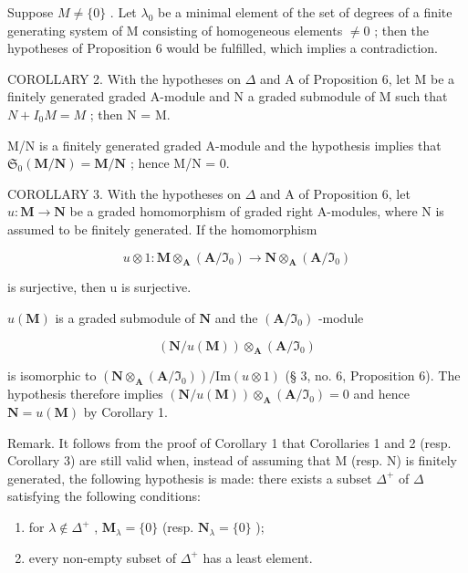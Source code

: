 Suppose \(M \neq \{0\}\) . Let \(\lambda_{0}\) be a minimal element of the set of degrees of a finite generating system of M consisting of homogeneous elements \(\neq0\) ; then the hypotheses of Proposition 6 would be fulfilled, which implies a contradiction.

COROLLARY 2. With the hypotheses on \(\Delta\) and A of Proposition 6, let M be a finitely generated graded A-module and N a graded submodule of M such that \(N + I_{0}M = M\) ; then N = M.

M/N is a finitely generated graded A-module and the hypothesis implies that \(\mathfrak{S}_{0}(\mathbf{M}/\mathbf{N}) = \mathbf{M}/\mathbf{N}\) ; hence M/N = 0.

COROLLARY 3. With the hypotheses on \(\Delta\) and A of Proposition 6, let \(u: \mathbf{M} \to \mathbf{N}\) be a graded homomorphism of graded right A-modules, where N is assumed to be finitely generated. If the homomorphism

\[
u \otimes 1: \mathbf {M} \otimes_ {\mathbf {A}} (\mathbf {A} / \mathfrak {I} _ {0}) \rightarrow \mathbf {N} \otimes_ {\mathbf {A}} (\mathbf {A} / \mathfrak {I} _ {0})
\]

is surjective, then u is surjective.

\(u(\mathbf{M})\) is a graded submodule of \(\mathbf{N}\) and the \((\mathbf{A} / \mathfrak{I}_0)\) -module

\[
(\mathbf {N} / u (\mathbf {M})) \otimes_ {\mathbf {A}} (\mathbf {A} / \mathfrak {I} _ {0})
\]

is isomorphic to \((\mathbf{N} \otimes_{\mathbf{A}} (\mathbf{A} / \mathfrak{I}_0)) / \mathrm{Im}(u \otimes 1)\) (§ 3, no. 6, Proposition 6). The hypothesis therefore implies \((\mathbf{N} / u(\mathbf{M})) \otimes_{\mathbf{A}} (\mathbf{A} / \mathfrak{I}_0) = 0\) and hence \(\mathbf{N} = u(\mathbf{M})\) by Corollary 1.

Remark. It follows from the proof of Corollary 1 that Corollaries 1 and 2 (resp. Corollary 3) are still valid when, instead of assuming that M (resp. N) is finitely generated, the following hypothesis is made: there exists a subset \(\Delta^{+}\) of \(\Delta\) satisfying the following conditions:

\begin{enumerate}
\def\labelenumi{(\arabic{enumi})}
\item
  for \(\lambda \notin \Delta^{+}\) , \(\mathbf{M}_{\lambda} = \{0\}\) (resp. \(\mathbf{N}_{\lambda} = \{0\}\) );
\item
  every non-empty subset of \(\Delta^{+}\) has a least element.
\end{enumerate}

